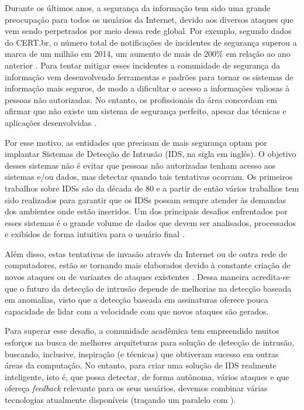 \documentclass[
	12pt,				%
	openright,			%
	twoside,			%
	a4paper,			%
	english,			%
	spanish,			%
	brazil,				%
	]{abntex2}
\begin{document}
Durante os últimos anos, a segurança da informação tem sido uma grande preocupação para todos os usuários da Internet, devido aos diversos ataques que vem sendo perpetrados por meio dessa rede global. Por exemplo, segundo dados do CERT.br, o número total de notificações de incidentes de segurança superou a marca de um milhão em 2014, um aumento de mais de 200\% em relação ao ano anterior \cite{incidentes2015incidentes}. Para tentar mitigar esses incidentes a comunidade de segurança da informação vem desenvolvendo ferramentas e padrões para tornar os sistemas de informação mais seguros, de modo a dificultar o acesso a informações valiosas à pessoas não autorizadas. No entanto, os profissionais da área concordam em afirmar que não existe um sistema de segurança perfeito, apesar das técnicas e aplicações desenvolvidas \cite{dua2011data}.

Por esse motivo, as entidades que precisam de mais segurança optam por implantar Sistemas de Detecção de Intrusão (IDS, na sigla em inglês). O objetivo desses sistemas não é evitar que pessoas não autorizadas tenham acesso aos sistemas e/ou dados, mas detectar quando tais tentativas ocorram. Os primeiros trabalhos sobre IDSs são da década de 80 \cite{anderson1980computer, denning1987intrusion} e a partir de então vários trabalhos tem sido realizados para garantir que os IDSs possam sempre atender às demandas dos ambientes onde estão inseridos. Um dos principais desafios enfrentados por esses sistemas é o grande volume de dados que devem ser analisados, processados e exibidos de forma intuitiva para o usuário final \cite{big2013big, nassar2013secure}.

Além disso, estas tentativas de invasão através da Internet ou de outra rede de computadores, estão se tornando mais elaborados devido à constante criação de novos ataques ou de variantes de ataques existentes \cite{zuech2015intrusion}. Dessa maneira acredita-se que o futuro da detecção de intrusão depende de melhorias na detecção baseada em anomalias, visto que a detecção baseada em assinaturas oferece pouca capacidade de lidar com a velocidade com que novos ataques são gerados.

Para superar esse desafio, a comunidade acadêmica tem empreendido muitos esforços na busca de melhores arquiteturas para solução de detecção de intrusão, buscando, inclusive, inspiração (e técnicas) que obtiveram sucesso em outras áreas da computação. No entanto, para criar uma solução de IDS realmente inteligente, isto é, que possa detectar, de forma autônoma, vários ataques e que ofereça \emph{feedback} relevante para os seus usuários, devemos combinar várias tecnologias atualmente disponíveis (traçando um paralelo com \cite{schales2011stream}).
\end{document}
